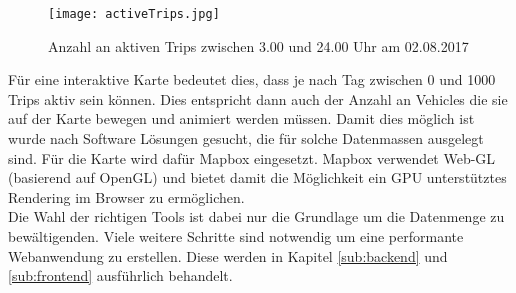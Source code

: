 \begin{newpage}
      \begin{figure}[htbp]
        \begin{center}
          \texttt{[image: activeTrips.jpg]}
          \caption{Anzahl an aktiven Trips zwischen 3.00 und 24.00 Uhr am 02.08.2017}
          \label{fig:activeTrips}
        \end{center}
      \end{figure}

      Für eine interaktive Karte bedeutet dies, dass je nach Tag zwischen 0 und 1000 Trips aktiv sein können. Dies entspricht dann auch der Anzahl an Vehicles die sie auf der Karte bewegen und animiert werden müssen. Damit dies möglich ist wurde nach Software Lösungen gesucht, die für solche Datenmassen ausgelegt sind. Für die Karte wird dafür Mapbox eingesetzt. Mapbox verwendet Web-GL (basierend auf OpenGL) und bietet damit die Möglichkeit ein GPU unterstütztes Rendering im Browser zu ermöglichen.\\

      Die Wahl der richtigen Tools ist dabei nur die Grundlage um die Datenmenge zu bewältigenden. Viele weitere Schritte sind notwendig um eine performante Webanwendung zu erstellen. Diese werden in Kapitel \ref{sub:backend}  und \ref{sub:frontend}  ausführlich behandelt.


        
\end{newpage}